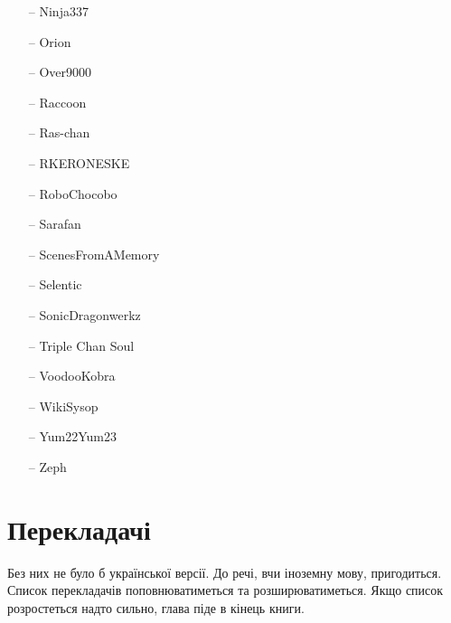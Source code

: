 \begin{multicols}{3}
\begin{itemize}
	\item[--] Ninja337
	\item[--] Orion
	\item[--] Over9000
	\item[--] Raccoon
	\item[--] Ras-chan
	\item[--] RKERONESKE
	\item[--] RoboChocobo
	\item[--] Sarafan
	\item[--] ScenesFromAMemory
	\item[--] Selentic
	\item[--] SonicDragonwerkz
	\item[--] Triple Chan Soul
	\item[--] VoodooKobra
	\item[--] WikiSysop
	\item[--] Yum22Yum23
	\item[--] Zeph
\end{itemize}
\end{multicols}

\section*{Перекладачі}
Без них не було б української версії. До речі, вчи іноземну мову, пригодиться.
Список перекладачів поповнюватиметься та розширюватиметься. Якщо список
розростеться надто сильно, глава піде в кінець книги.